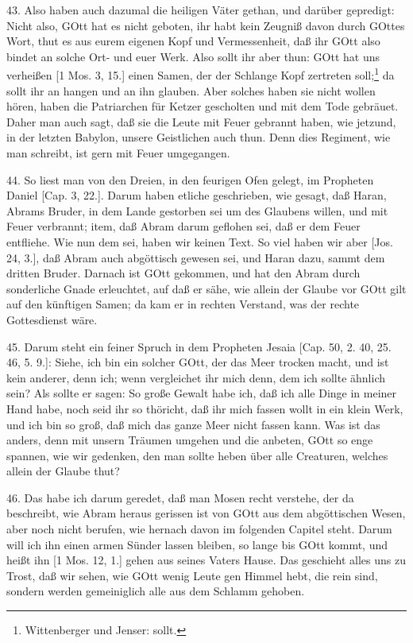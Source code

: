43. Also haben auch dazumal die heiligen Väter gethan, und darüber gepredigt: Nicht also, GOtt hat es nicht geboten, ihr habt kein Zeugniß davon durch GOttes Wort, thut es aus eurem eigenen Kopf und Vermessenheit, daß ihr GOtt also bindet an solche Ort- und euer Werk. Also sollt ihr aber thun: GOtt hat uns verheißen [1 Mos. 3, 15.] einen Samen, der der Schlange Kopf zertreten soll;\footnote{Wittenberger und Jenser: sollt.} da sollt ihr an hangen und an ihn glauben. Aber solches haben sie nicht wollen hören, haben die Patriarchen für Ketzer gescholten und mit dem Tode gebräuet. Daher man auch sagt, daß sie die Leute mit Feuer gebrannt haben, wie jetzund, in der letzten
Babylon, unsere Geistlichen auch thun. Denn dies Regiment, wie man schreibt, ist gern mit Feuer umgegangen.

44. So liest man von den Dreien, in den feurigen Ofen gelegt, im Propheten Daniel [Cap. 3, 22.]. Darum haben etliche geschrieben, wie gesagt, daß Haran, Abrams Bruder, in dem Lande gestorben sei um des Glaubens willen, und mit Feuer verbrannt; item, daß Abram darum geflohen sei, daß er dem Feuer entfliehe. Wie nun dem sei, haben wir keinen Text. So viel haben wir aber [Jos. 24, 3.], daß Abram auch abgöttisch gewesen sei, und Haran dazu, sammt dem dritten Bruder. Darnach ist GOtt gekommen, und hat den Abram durch sonderliche Gnade erleuchtet, auf daß er sähe, wie allein der Glaube vor GOtt gilt auf den künftigen Samen; da kam er in rechten Verstand, was der rechte Gottesdienst wäre.

45. Darum steht ein feiner Spruch in dem Propheten Jesaia [Cap. 50, 2. 40, 25. 46, 5. 9.]: Siehe, ich bin ein solcher GOtt, der das Meer trocken macht, und ist kein anderer, denn ich; wenn vergleichet ihr mich denn, dem ich sollte ähnlich sein? Als sollte er sagen: So große Gewalt habe ich, daß ich alle Dinge in meiner Hand habe, noch seid ihr so thöricht, daß ihr mich fassen wollt in ein klein Werk, und ich bin so groß, daß mich das ganze Meer nicht fassen kann. Was ist das anders, denn mit unsern Träumen umgehen und die anbeten, GOtt so enge spannen, wie wir gedenken, den man sollte heben über alle Creaturen, welches allein der Glaube thut?

46. Das habe ich darum geredet, daß man Mosen recht verstehe, der da beschreibt, wie Abram heraus gerissen ist von GOtt aus dem abgöttischen Wesen, aber noch nicht berufen, wie hernach davon im folgenden Capitel steht. Darum will ich ihn einen armen Sünder lassen bleiben, so lange bis GOtt kommt, und heißt ihn [1 Mos. 12, 1.] gehen aus seines Vaters Hause. Das geschieht alles uns zu Trost, daß wir sehen, wie GOtt wenig Leute gen Himmel hebt, die rein sind, sondern werden gemeiniglich alle aus dem Schlamm gehoben.

